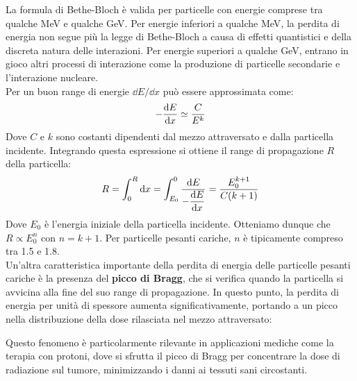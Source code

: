 
La formula di Bethe-Bloch è valida per particelle con energie comprese tra qualche MeV e qualche GeV. Per energie inferiori a qualche MeV, la perdita di energia non segue più la legge di Bethe-Bloch a causa di effetti quantistici e della discreta natura delle interazioni. Per energie superiori a qualche GeV, entrano in gioco altri processi di interazione come la produzione di particelle secondarie e l'interazione nucleare.\\
Per un buon range di energie $\dd{E}/\dd{x}$ può essere approssimata come:
\begin{equation}
    -\dv{E}{x} \simeq \dfrac{C}{E^{k}}
\end{equation}
Dove $C$ e $k$ sono costanti dipendenti dal mezzo attraversato e dalla particella incidente. Integrando questa espressione si ottiene il range di propagazione $R$ della particella:
\begin{equation}
    R = \int_0^{R} \diff{x} = \int_{E_0}^{0} \dfrac{\diff{E}}{-\dv{E}{x}} = \dfrac{E_0^{k+1}}{C(k+1)}
\end{equation}
Dove $E_0$ è l'energia iniziale della particella incidente. Otteniamo dunque che $R \propto E_0^{n}$ con $n = k+1$. Per particelle pesanti cariche, $n$ è tipicamente compreso tra 1.5 e 1.8.\\
Un'altra caratteristica importante della perdita di energia delle particelle pesanti cariche è la presenza del \textbf{picco di Bragg}, che si verifica quando la particella si avvicina alla fine del suo range di propagazione. In questo punto, la perdita di energia per unità di spessore aumenta significativamente, portando a un picco nella distribuzione della dose rilasciata nel mezzo attraversato:


Questo fenomeno è particolarmente rilevante in applicazioni mediche come la terapia con protoni, dove si sfrutta il picco di Bragg per concentrare la dose di radiazione sul tumore, minimizzando i danni ai tessuti sani circostanti.
